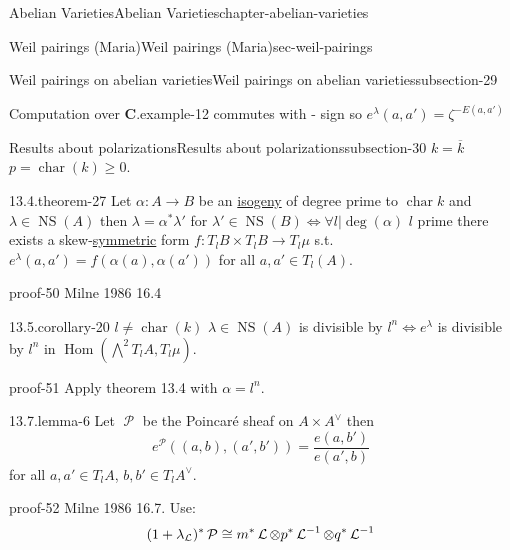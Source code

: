 \documentclass[oneside,10pt,]{book}
\renewcommand{\qedhere}{\relax}
\numberwithin{equation}{section}
\newcommand{\sheaf}[1]{\operatorname{\mathcal{#1}}}
\newcommand{\CC}{\mathbf{C}}
\DeclareMathOperator{\Hom}{Hom}
\DeclareMathOperator{\characteristic}{char}
\DeclareMathOperator{\NS}{NS}
\begin{document}
\begin{chapterptx}{Abelian Varieties}{}{Abelian Varieties}{}{}{chapter-abelian-varieties}
\begin{sectionptx}{Weil pairings (Maria)}{}{Weil pairings (Maria)}{}{}{sec-weil-pairings}
\begin{subsectionptx}{Weil pairings on abelian varieties}{}{Weil pairings on abelian varieties}{}{}{subsection-29}
\begin{example}{Computation over \(\CC\).}{example-12}
commutes with - sign so \(e^\lambda (a,a') = \zeta^{-E(a,a')}\)%
\end{example}
\end{subsectionptx}
%
%
\typeout{************************************************}
\typeout{************************************************}
%
\begin{subsectionptx}{Results about polarizations}{}{Results about polarizations}{}{}{subsection-30}
\hypertarget{p-309}{}%
\(k = \overline k\) \(p = \characteristic (k) \ge 0\).%
\begin{theorem}{13.4.}{}{theorem-27}%
\hypertarget{p-310}{}%
Let \(\alpha\colon A\to B\) be an \hyperref[def-supersing-isog-isog]{isogeny} of degree prime to \(\characteristic k\) and \(\lambda \in \NS(A)\) then \(\lambda = \alpha^* \lambda '\) for \(\lambda ' \in \NS(B) \iff \forall l |\deg(\alpha)\) \(l\) prime there exists a skew-\hyperref[def-princ-pol]{symmetric} form \(f\colon T_lB\times T_lB \to T_l\mu\) s.t. \(e^\lambda(a,a') = f(\alpha(a), \alpha(a'))\) for all \(a,a' \in T_l(A)\).%
\end{theorem}
\begin{proofptx}{}{proof-50}
\hypertarget{p-311}{}%
Milne 1986 16.4%
\end{proofptx}
\begin{corollary}{13.5.}{}{corollary-20}%
\hypertarget{p-312}{}%
\(l \ne \characteristic (k)\) \(\lambda \in \NS(A) \) is divisible by \(l^n \iff e^\lambda\) is divisible by \(l^n\) in \(\Hom (\bigwedge^2 T_lA, T_l \mu)\).%
\end{corollary}
\begin{proofptx}{}{proof-51}
\hypertarget{p-313}{}%
Apply theorem 13.4 with \(\alpha = l^n\).%
\end{proofptx}
\begin{lemma}{13.7.}{}{lemma-6}%
\hypertarget{p-314}{}%
Let \(\sheaf P\) be the Poincaré sheaf on \(A\times A^\vee\) then%
\begin{equation*}
e^{\sheaf P} ((a,b),(a',b')) = \frac{e(a,b')}{e(a',b)}
\end{equation*}
for all \(a,a' \in T_l A\), \(b,b' \in T_l A^\vee\).%
\end{lemma}
\begin{proofptx}{}{proof-52}
\hypertarget{p-315}{}%
Milne 1986 16.7. Use:%
\begin{equation*}
(1+ \lambda_{\sheaf L})^* \sheaf P \cong m^* \sheaf L \otimes p^* \sheaf L^{-1} \otimes q^* \sheaf L^{-1}\qedhere
\end{equation*}

\end{proofptx}
\end{subsectionptx}
\end{sectionptx}
\end{chapterptx}
\end{document}
